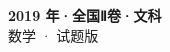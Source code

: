 \documentclass[zihao=-4, a4paper]{ctexart}
\begin{document}
\begin{center}
  {\Large\bfseries 2019 年·全国Ⅱ卷·文科}\\[4pt]
  {\large 数学 · 试题版}
\end{center}
\medskip
{}

\end{document}
